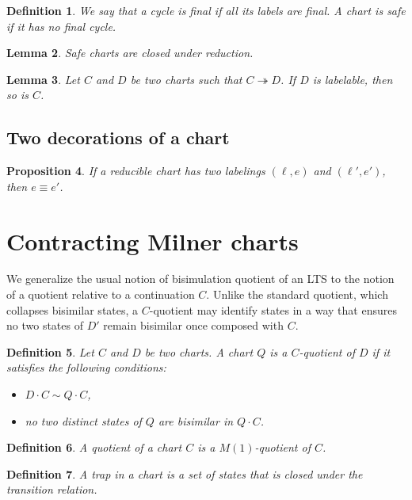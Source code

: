 \documentclass{article}
\newtheorem{definition}{Definition}[section]
\newtheorem{lemma}[definition]{Lemma}
\newtheorem{proposition}[definition]{Proposition}
\begin{document}
\begin{definition}
We say that a cycle is final if all its labels are final. A chart is safe if it has no final cycle.
\end{definition}

\begin{lemma} Safe charts are closed under reduction.\end{lemma}
    \begin{lemma}
    Let $C$ and $D$ be two charts such that $C \twoheadrightarrow D$. If $D$ is labelable,
     then so is $C$.   \end{lemma}

     \subsection{Two decorations of a chart}

\begin{proposition}
    If a reducible chart has two labelings  $(\ell,e)$ and $(\ell',e')$, then $e \equiv e'$.~\label{prop:two-decorations-implies-equiv}
\end{proposition}


\section{Contracting Milner charts}

We generalize the usual notion of bisimulation quotient of an LTS to the notion of a quotient relative to a continuation $C$.
Unlike the standard quotient, which collapses bisimilar states, 
a $C$-quotient may identify states in a way that ensures no two states of $D'$ remain bisimilar once composed with $C$.

\begin{definition}
Let $C$ and $D$ be  two charts.  A chart $Q$ is a \emph{ $C$-quotient} of $D$ if it satisfies the following conditions:
\begin{itemize}
  \item $D \cdot C \sim Q \cdot C$,
  \item no two distinct states of $Q$ are bisimilar in $Q \cdot C$.
\end{itemize}
\end{definition}

\begin{definition} A quotient of a chart $C$ is a $M(1)$-quotient of $C$.
\end{definition}
 
\begin{definition}
 A \emph{trap} in a chart is a set of states that is closed under the transition relation.
 \end{definition}
\end{document}
